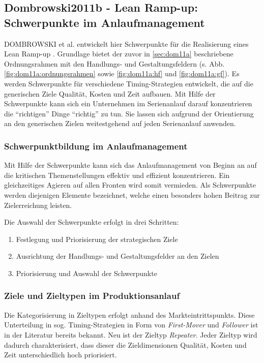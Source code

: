 \subsection*{Dombrowski2011b - Lean Ramp-up: Schwerpunkte im Anlaufmanagement}

DOMBROWSKI et al. entwickelt hier Schwerpunkte für die Realisierung eines Lean Ramp-up \cite{Dombrowski2011b}. Grundlage bietet der zuvor in \ref{sec:dom11a} beschriebene Ordnungsrahmen mit den Handlungs- und Gestaltungsfeldern (s. Abb. \ref{fig:dom11a:ordnungsrahmen} sowie \ref{fig:dom11a:hf} und \ref{fig:dom11a:gf}). Es werden Schwerpunkte für verschiedene Timing-Strategien entwickelt, die auf die generischen Ziele Qualität, Kosten und Zeit aufbauen. Mit Hilfe der Schwerpunkte kann sich ein Unternehmen im Serienanlauf darauf konzentrieren die ``richtigen'' Dinge ``richtig'' zu tun. Sie lassen sich aufgrund der Orientierung an den generischen Zielen weitestgehend auf jeden Serienanlauf anwenden. 

\subsubsection{Schwerpunktbildung im Anlaufmanagement}

Mit Hilfe der Schwerpunkte kann sich das Anlaufmanagement von Beginn an auf die kritischen Themenstellungen effektiv und effizient konzentrieren. Ein gleichzeitiges Agieren auf allen Fronten wird somit vermieden. Als Schwerpunkte werden diejenigen Elemente bezeichnet, welche einen besonders hohen Beitrag zur Zielerreichung leisten. 

Die Auswahl der Schwerpunkte erfolgt in drei Schritten: 
\begin{enumerate}
 \item Festlegung und Priorisierung der strategischen Ziele
 \item Ausrichtung der Handlungs- und Gestaltungsfelder an den Zielen
 \item Priorisierung und Auswahl der Schwerpunkte
\end{enumerate}

\subsubsection{Ziele und Zieltypen im Produktionsanlauf}
Die Kategorisierung in Zieltypen erfolgt anhand des Markteintrittspunkts. Diese Unterteilung in sog. Timing-Strategien in Form von \textit{First-Mover} und \textit{Follower} ist in der Literatur bereits bekannt. Neu ist der Zieltyp \textit{Repeater}. Jeder Zieltyp wird dadurch charakterisiert, dass dieser die Zieldimensionen Qualität, Kosten und Zeit unterschiedlich hoch priorisiert. 

